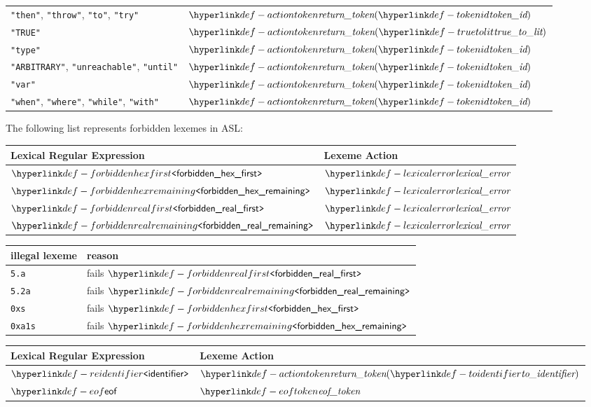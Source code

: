 \begin{center}
\begin{tabular}{ll}
\texttt{"then"},    \texttt{"throw"},   \texttt{"to"}, \texttt{"try"}         & $\actiontoken(\tokenid)$ \\
\texttt{"TRUE"}          & $\actiontoken(\truetolit)$ \\
\texttt{"type"}          & $\actiontoken(\tokenid)$ \\
\texttt{"ARBITRARY"}, \texttt{"unreachable"}, \texttt{"until"}         & $\actiontoken(\tokenid)$ \\
\texttt{"var"}           & $\actiontoken(\tokenid)$ \\
\texttt{"when"}, \texttt{"where"}, \texttt{"while"}, \texttt{"with"}          & $\actiontoken(\tokenid)$ \\
\hline
\end{tabular}
\end{center}

The following list represents forbidden lexemes in ASL:
\begin{center}
  \begin{tabular}{ll}
    \textbf{Lexical Regular Expression} & \textbf{Lexeme Action}\\
    \hline
    $\REforbiddenhexfirst$ & $\lexicalerror$ \\
    $\REforbiddenhexremaining$ & $\lexicalerror$ \\
    $\REforbiddenrealfirst$ & $\lexicalerror$ \\
    $\REforbiddenrealremaining$ & $\lexicalerror$ \\
    \hline
  \end{tabular}
\end{center}

\begin{center}
\begin{tabular}{ll}
\textbf{illegal lexeme} & \textbf{reason}\\
\hline
\verb|5.a| & fails $\REforbiddenrealfirst$\\
\verb|5.2a| & fails $\REforbiddenrealremaining$\\
\verb|0xs| & fails $\REforbiddenhexfirst$\\
\verb|0xa1s| & fails $\REforbiddenhexremaining$\\
\end{tabular}
\end{center}
\begin{center}
\begin{tabular}{ll}

\textbf{Lexical Regular Expression} & \textbf{Lexeme Action}\\
\hline
$\REidentifier$   & $\actiontoken(\toidentifier)$ \\
$\eof$            & $\eoftoken$ \\
\hline
\end{tabular}
\end{center}

